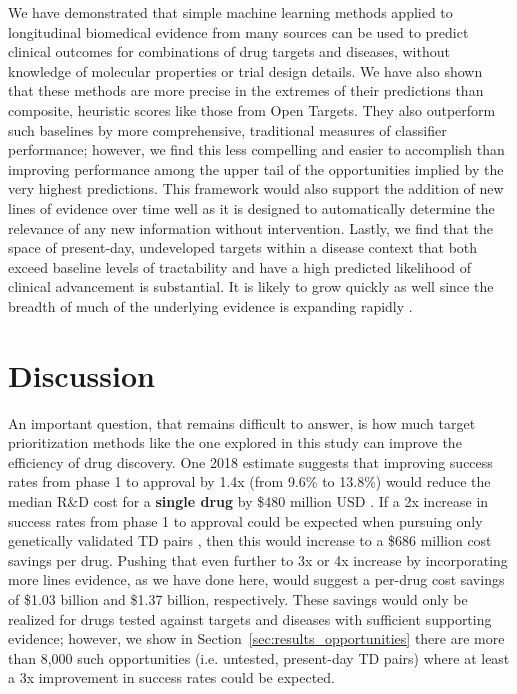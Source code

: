 \documentclass{article}
\begin{document}
We have demonstrated that simple machine learning methods applied to longitudinal biomedical evidence from many sources can be used to predict clinical outcomes for combinations of drug targets and diseases, without knowledge of molecular properties or trial design details. We have also shown that these methods are more precise in the extremes of their predictions than composite, heuristic scores like those from Open Targets. They also outperform such baselines by more comprehensive, traditional measures of classifier performance; however, we find this less compelling and easier to accomplish than improving performance among the upper tail of the opportunities implied by the very highest predictions. This framework would also support the addition of new lines of evidence over time well as it is designed to automatically determine the relevance of any new information without intervention. Lastly, we find that the space of present-day, undeveloped targets within a disease context that both exceed baseline levels of tractability and have a high predicted likelihood of clinical advancement is substantial. It is likely to grow quickly as well since the breadth of much of the underlying evidence is expanding rapidly \cite{PMID:33214558,PMID:36634672,PMID:31491408}.

\section{Discussion}
\label{sec:discussion}

An important question, that remains difficult to answer, is how much target prioritization methods like the one explored in this study can improve the efficiency of drug discovery. One 2018 estimate suggests that improving success rates from phase 1 to approval by 1.4x (from 9.6\% to 13.8\%) would reduce the median R\&D cost for a \textbf{single drug} by \$480 million USD \cite{PMID:32125404}. If a 2x increase in success rates from phase 1 to approval could be expected when pursuing only genetically validated TD pairs \cite{Nelson2015-eg}, then this would increase to a \$686 million cost savings per drug. Pushing that even further to 3x or 4x increase by incorporating more lines evidence, as we have done here, would suggest a per-drug cost savings of \$1.03 billion and \$1.37 billion, respectively. These savings would only be realized for drugs tested against targets and diseases with sufficient supporting evidence; however, we show in Section~\ref{sec:results_opportunities} there are more than 8,000 such opportunities (i.e. untested, present-day TD pairs) where at least a 3x improvement in success rates could be expected.
\end{document}
